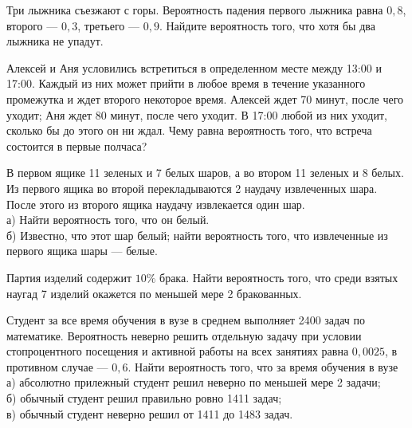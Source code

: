 \newpage\setcounter{zad}{0}



\begin{zkrW}{20}\noindent 
	Три лыжника съезжают с горы. Вероятность падения первого лыжника равна $0{,}8$, второго --- $0{,}3$, третьего --- $0{,}9$. Найдите вероятность того, что хотя бы два лыжника не упадут.
 
\end{zkrW}

\begin{zkrW}{20}\noindent 
	Алексей и Аня условились встретиться в определенном месте между 13:00 и 17:00. Каждый из них может прийти в любое время в течение указанного промежутка и ждет второго некоторое время. Алексей ждет 70 минут, после чего уходит; Аня ждет 80 минут, после чего уходит. В 17:00 любой из них уходит, сколько бы до этого он ни ждал. Чему равна вероятность того, что встреча состоится в первые полчаса?
 
\end{zkrW}

\begin{zkrW}{20}\noindent 
	В первом ящике 11 зеленых и 7 белых шаров, а во втором 11 зеленых и 8 белых. Из первого ящика во второй перекладываются 2 наудачу извлеченных шара. После этого из второго ящика наудачу извлекается один шар. \\ \indent а) Найти вероятность того, что он белый. \\ \indent б) Известно, что этот шар белый; найти вероятность того, что извлеченные из первого ящика шары --- белые.
 
\end{zkrW}

\begin{zkrW}{20}\noindent 
	Партия изделий содержит $10\%$ брака. Найти вероятность того, что среди взятых наугад 7 изделий окажется по меньшей мере 2 бракованных.
 
\end{zkrW}

\begin{zkrW}{20}\noindent 
	Студент за все время обучения в вузе в среднем выполняет 2400 задач по математике. Вероятность неверно решить отдельную задачу при условии стопроцентного посещения и активной работы на всех занятиях равна $0{,}0025$, в противном случае --- $0{,}6$. Найти вероятность того, что за время обучения в вузе \\ \indent а) абсолютно прилежный студент решил неверно по меньшей мере 2 задачи; \\ \indent б) обычный студент решил правильно ровно 1411 задач; \\ \indent в) обычный студент неверно решил от 1411 до 1483 задач.
 
\end{zkrW}

